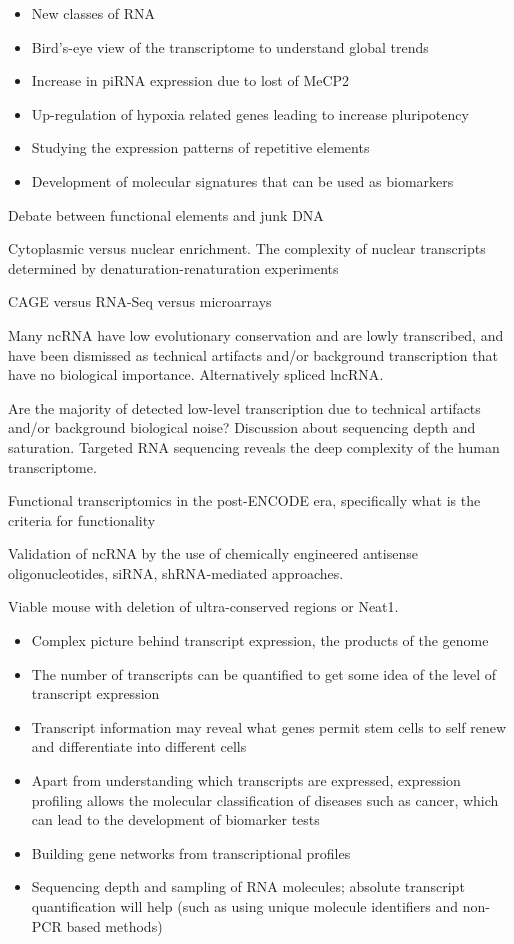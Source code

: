 \begin{itemize}
   \item New classes of RNA
   \item Bird’s-eye view of the transcriptome to understand global trends
   \item Increase in piRNA expression due to lost of MeCP2
   \item Up-regulation of hypoxia related genes leading to increase pluripotency
   \item Studying the expression patterns of repetitive elements
   \item Development of molecular signatures that can be used as biomarkers
\end{itemize}

Debate between functional elements and junk DNA

Cytoplasmic versus nuclear enrichment. The complexity of nuclear transcripts determined by denaturation-renaturation experiments\cite{pmid5969070}

CAGE versus RNA-Seq versus microarrays\cite{pmid24676093}

Many ncRNA have low evolutionary conservation and are lowly transcribed, and have been dismissed as technical artifacts and/or background transcription that have no biological importance. Alternatively spliced lncRNA\cite{Johnsson2013}.

Are the majority of detected low-level transcription due to technical artifacts and/or background biological noise? Discussion about sequencing depth and saturation. Targeted RNA sequencing reveals the deep complexity of the human transcriptome\cite{pmid22081020}.

Functional transcriptomics in the post-ENCODE era, specifically what is the criteria for functionality

Validation of ncRNA by the use of chemically engineered antisense oligonucleotides, siRNA, shRNA-mediated approaches.

Viable mouse with deletion of ultra-conserved regions\cite{pmid17803355} or Neat1\cite{pmid21444682}.

\begin{itemize}
   \item Complex picture behind transcript expression, the products of the genome
   \item The number of transcripts can be quantified to get some idea of the level of transcript expression
   \item Transcript information may reveal what genes permit stem cells to self renew and differentiate into different cells
   \item Apart from understanding which transcripts are expressed, expression profiling allows the molecular classification of diseases such as cancer, which can lead to the development of biomarker tests   \item Building gene networks from transcriptional profiles
   \item Sequencing depth and sampling of RNA molecules; absolute transcript quantification will help (such as using unique molecule identifiers and non-PCR based methods)
\end{itemize}


